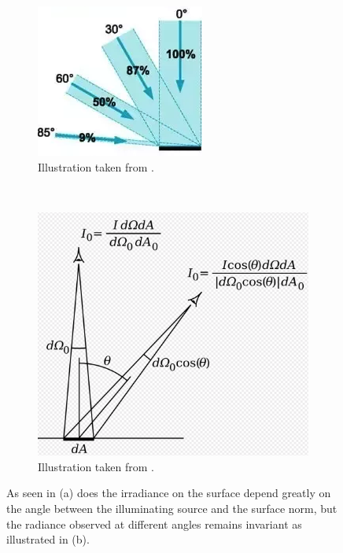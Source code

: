 \begin{figure}[H]
	\centering
	\begin{subfigure}[t]{0.45\linewidth}
		\centering
		\includegraphics[width=\linewidth]{Materials/Irradiance}
		\caption{Illustration taken from \cite{quora}.}
	\end{subfigure}%
	~
	\begin{subfigure}[t]{0.45\linewidth}
		\centering
		\includegraphics[width=\linewidth]{Materials/Radiance}
		\caption{Illustration taken from \cite{lamberts_law_wiki}.}
	\end{subfigure}
	\caption{As seen in (a) does the irradiance on the surface depend greatly on the angle between the illuminating source and the surface norm, but the radiance observed at different angles remains invariant as illustrated in (b).}
\end{figure}
